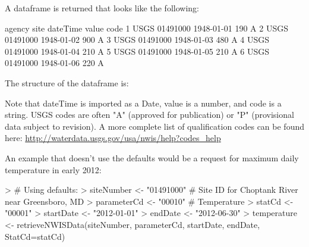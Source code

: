 \documentclass[a4paper,11pt]{article}
\begin{document}
A dataframe is returned that looks like the following:
\begin{Schunk}
\begin{Soutput}
  agency     site   dateTime value code
1   USGS 01491000 1948-01-01   190    A
2   USGS 01491000 1948-01-02   900    A
3   USGS 01491000 1948-01-03   480    A
4   USGS 01491000 1948-01-04   210    A
5   USGS 01491000 1948-01-05   210    A
6   USGS 01491000 1948-01-06   220    A
\end{Soutput}
\end{Schunk}
The structure of the dataframe is:
\begin{Schunk}
\end{Schunk}
Note that dateTime is imported as a Date, value is a number, and code is a string.  USGS codes are often "A" (approved for publication) or "P" (provisional data subject to revision). A more complete list of qualification codes can be found here:
\url{http://waterdata.usgs.gov/usa/nwis/help?codes_help}

An example that doesn't use the defaults would be a request for maximum daily temperature in early 2012:
\begin{Schunk}
\begin{Sinput}
> # Using defaults:
> siteNumber <- "01491000" # Site ID for Choptank River near Greensboro, MD
> parameterCd <- "00010"  # Temperature
> statCd <- "00001"
> startDate <- "2012-01-01"
> endDate <- "2012-06-30"
> temperature <- retrieveNWISData(siteNumber, parameterCd, startDate, endDate, StatCd=statCd)
\end{Sinput}
\end{Schunk}

\end{document}
